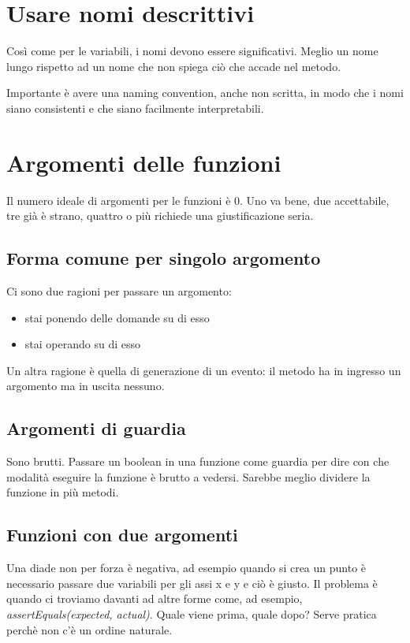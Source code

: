 \documentclass[11pt,a4paper]{book}
\begin{document}
\section{Usare nomi descrittivi}
Così come per le variabili, i nomi devono essere significativi. Meglio un nome lungo rispetto ad un nome che non spiega ciò che accade nel metodo.

Importante è avere una naming convention, anche non scritta, in modo che i nomi siano consistenti e che siano facilmente interpretabili.

\section{Argomenti delle funzioni}
Il numero ideale di argomenti per le funzioni è 0. Uno va bene, due accettabile, tre già è strano, quattro o più richiede una giustificazione seria.

\subsection{Forma comune per singolo argomento}
Ci sono due ragioni per passare un argomento:
\begin{itemize}
	\item stai ponendo delle domande su di esso
	\item stai operando su di esso
\end{itemize}

Un altra ragione è quella di generazione di un evento: il metodo ha in ingresso un argomento ma in uscita nessuno.

\subsection{Argomenti di guardia}
Sono brutti. Passare un boolean in una funzione come guardia per dire con che modalità eseguire la funzione è brutto a vedersi. Sarebbe meglio dividere la funzione in più metodi.

\subsection{Funzioni con due argomenti}
Una diade non per forza è negativa, ad esempio quando si crea un punto è necessario passare due variabili per gli assi x e y e ciò è giusto. Il problema è quando ci troviamo davanti ad altre forme come, ad esempio, \emph{assertEquals(expected, actual)}. Quale viene prima, quale dopo? Serve pratica perchè non c'è un ordine naturale.
\end{document}
